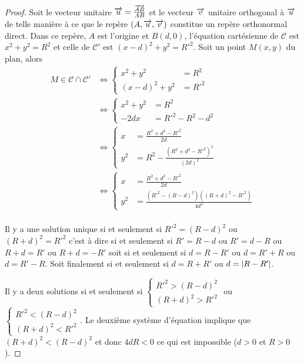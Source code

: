\begin{proof}
  Soit le vecteur unitaire \(\overrightarrow{u} = \frac{\overrightarrow{AB}}{AB}\) et le vecteur 
  \(\overrightarrow{v}\) unitaire orthogonal à \(\overrightarrow{u}\) de telle manière à ce que le repère 
  \((A, \overrightarrow{u}, \overrightarrow{v})\) constitue un repère orthonormal direct. Dans ce 
  repère, \(A\) est l'origine et \(B(d, 0)\), l'équation cartésienne de 
  \(\mathcal{C}\) est \(x^2 + y^2 = R^2\) et celle de \(\mathcal{C}'\) est 
  \((x - d)^2 + y^2 = R'^2\). Soit un point \(M(x, y)\) du plan, alors
  \begin{align}
    M \in \mathcal{C} \cap \mathcal{C}' 
      &\iff 
      \begin{cases}
        x^2 + y^2 &= R^2 \\ (x - d)^2 + y^2 &= R'^2
      \end{cases}\\
      &\iff 
      \begin{cases}
        x^2 + y^2 &= R^2 \\ -2dx &= R'^2 - R^2 - d^2
      \end{cases}\\
      &\iff 
      \begin{cases} 
        x &= \frac{R^2 + d^2 - R'^2}{2d} \\
        y^2 &= R^2 - \frac{(R^2 + d^2 - R'^2)^2}{(2d)^2}
      \end{cases}\\
      &\iff 
      \begin{cases}
        x &= \frac{R^2 + d^2 - R'^2}{2d} \\ 
        y^2 &= \frac{(R'^2 - (R - d)^2)((R + d)^2 - R'^2)}{4d^2}
      \end{cases}\\
  \end{align}

  Il y a une solution unique si et seulement si \(R'^2 = (R - d)^2\) ou 
  \((R + d)^2 = R'^2\) c'est à dire si et seulement si \(R' = R - d\) ou 
  \(R' = d - R\) ou \(R + d = R'\) ou \(R + d = -R'\) soit si et seulement 
  si \(d = R - R'\) ou \(d = R' + R\) ou \(d = R' - R\). Soit finalement si 
  et seulement si \(d = R + R'\) ou \(d = \left\lvert R - R'\right\rvert\).

  Il y a deux solutions si et seulement si \(
  \begin{cases}
    R'^2 > (R - d)^2 \\ 
    (R + d)^2>R'^2
  \end{cases}
  \) ou \(
  \begin{cases}
    R'^2 < (R - d)^2 \\
    (R + d)^2<R'^2
  \end{cases}
  \).
  Le deuxième système d'équation implique que \((R + d)^2<(R - d)^2\) et 
  donc \(4dR<0\) ce qui est impossible (\(d>0\) et \(R>0\)).


\end{proof}
